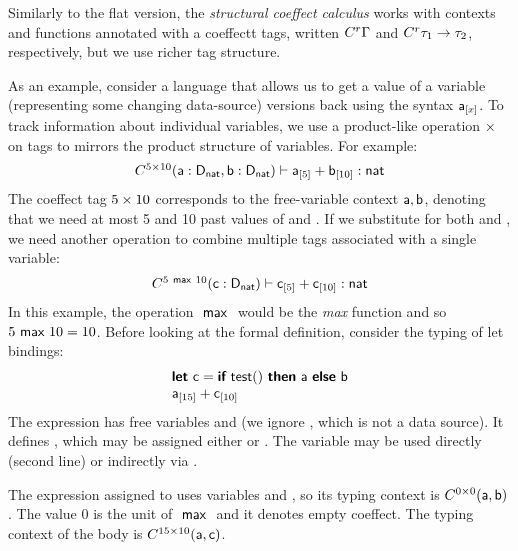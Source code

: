 Similarly to the flat version, the \emph{structural coeffect calculus} works with contexts and
functions annotated with a coeffectt tags, written $C^{r}\Gamma$ and $C^{r}\tau_1 \rightarrow \tau_2$, 
respectively, but we use richer tag structure.

As an example, consider a language that allows us to get a value of a variable (representing
some changing data-source)  versions back using the syntax $\textnormal{\sffamily a}_{[x]}$. 
To track information about individual variables, we use a product-like operation $\times$ on tags 
to mirrors the product structure of variables. For example:
%
\begin{equation*}
\begin{array}{l}
\ctyp{5 \cprd 10}{(\ident{a}:\dnat, \ident{b}:\dnat)}
  \vdash
    \pastval{a}{5}+\pastval{b}{10}: \ident{nat}
\end{array}
\end{equation*}
%
The coeffect tag $5 \times 10$ corresponds to the free-variable context $\textnormal{\sffamily a}, \textnormal{\sffamily b}$, denoting
that we need at most 5 and 10 past values of  and . If we substitute 
for both  and , we need another operation to combine multiple tags associated with 
a single variable:
%
\begin{equation*}
\begin{array}{l}
\ctyp{5 \cvop 10}{(\ident{c}:\dnat)}
  \vdash
    \pastval{c}{5}+\pastval{c}{10}: \ident{nat}
\end{array}
\end{equation*}
%
In this example, the operation $~\textnormal{\sffamily max}~$ would be the \emph{max} function and so $5 ~\textnormal{\sffamily max}~ 10 = 10$.
Before looking at the formal definition, consider the typing of let bindings:
%
\begin{equation*}
\begin{array}{l}
\kvd{let}~\ident{c} = \kvd{if}~\ident{test}()~\kvd{then}~\ident{a}~\kvd{else}~\ident{b}\\
\pastval{a}{15}+\pastval{c}{10}
\end{array}
\end{equation*}
%
The expression has free variables  and  (we ignore , which
is not a data source). It defines , which may be assigned either  or .
The variable  may be used directly (second line) or indirectly via .

The expression assigned to  uses variables  and , so its typing
context is $C^{0 \times 0}(\textnormal{\sffamily a}, \textnormal{\sffamily b})$. The value $0$ is the unit
of $~\textnormal{\sffamily max}~$ and it denotes empty coeffect. The typing context of the
body is $C^{15 \times 10}(\textnormal{\sffamily a}, \textnormal{\sffamily c})$.

